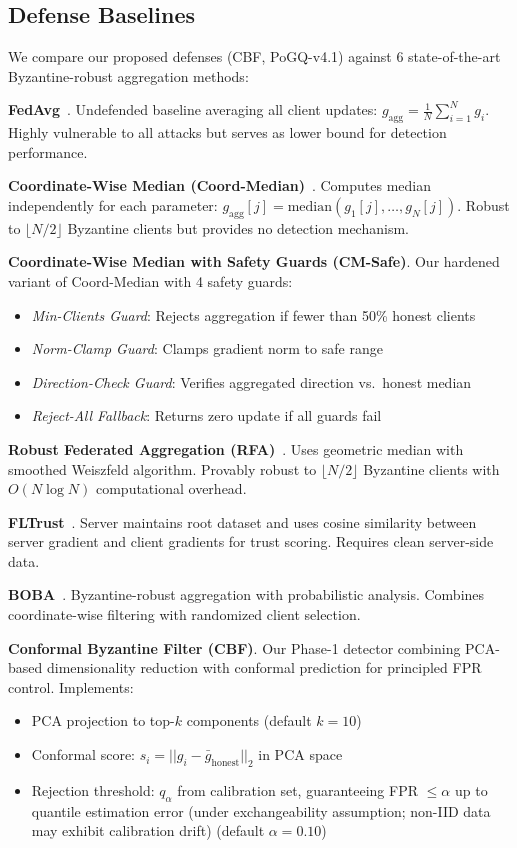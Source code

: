 \subsection{Defense Baselines}
\label{sec:defenses}

We compare our proposed defenses (CBF, PoGQ-v4.1) against 6 state-of-the-art Byzantine-robust aggregation methods:

\textbf{FedAvg}~\cite{mcmahan2017communication}. Undefended baseline averaging all client updates: $g_{\text{agg}} = \frac{1}{N}\sum_{i=1}^{N} g_i$. Highly vulnerable to all attacks but serves as lower bound for detection performance.

\textbf{Coordinate-Wise Median (Coord-Median)}~\cite{yin2018byzantine}. Computes median independently for each parameter: $g_{\text{agg}}[j] = \text{median}(g_1[j], \ldots, g_N[j])$. Robust to $\lfloor N/2 \rfloor$ Byzantine clients but provides no detection mechanism.

\textbf{Coordinate-Wise Median with Safety Guards (CM-Safe)}. Our hardened variant of Coord-Median with 4 safety guards:
\begin{itemize}[leftmargin=*,noitemsep]
    \item \textit{Min-Clients Guard}: Rejects aggregation if fewer than 50\% honest clients
    \item \textit{Norm-Clamp Guard}: Clamps gradient norm to safe range
    \item \textit{Direction-Check Guard}: Verifies aggregated direction vs.\ honest median
    \item \textit{Reject-All Fallback}: Returns zero update if all guards fail
\end{itemize}

\textbf{Robust Federated Aggregation (RFA)}~\cite{pillutla2019robust}. Uses geometric median with smoothed Weiszfeld algorithm. Provably robust to $\lfloor N/2 \rfloor$ Byzantine clients with $O(N \log N)$ computational overhead.

\textbf{FLTrust}~\cite{cao2020fltrust}. Server maintains root dataset and uses cosine similarity between server gradient and client gradients for trust scoring. Requires clean server-side data.

\textbf{BOBA}~\cite{rodriguez2022boba}. Byzantine-robust aggregation with probabilistic analysis. Combines coordinate-wise filtering with randomized client selection.

\textbf{Conformal Byzantine Filter (CBF)}. Our Phase-1 detector combining PCA-based dimensionality reduction with conformal prediction for principled FPR control. Implements:
\begin{itemize}[leftmargin=*,noitemsep]
    \item PCA projection to top-$k$ components (default $k=10$)
    \item Conformal score: $s_i = ||g_i - \bar{g}_{\text{honest}}||_2$ in PCA space
    \item Rejection threshold: $q_{\alpha}$ from calibration set, guaranteeing FPR $\leq \alpha$ up to quantile estimation error (under exchangeability assumption; non-IID data may exhibit calibration drift) (default $\alpha = 0.10$)
\end{itemize}

